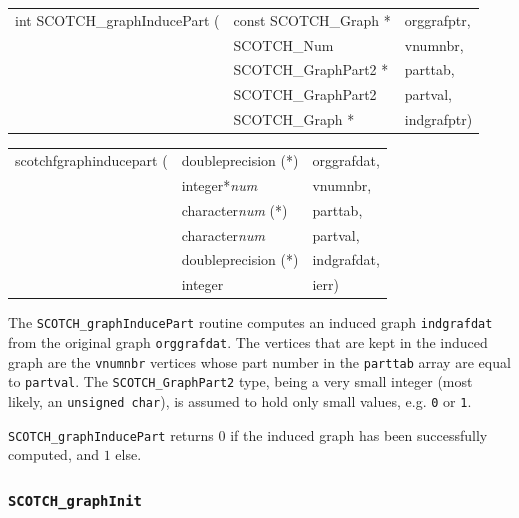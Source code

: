 \begin{itemize}
\progsyn

{\tt\begin{tabular}{l@{}ll}
int SCOTCH\_graphInducePart ( & const SCOTCH\_Graph * & orggrafptr, \\
                              & SCOTCH\_Num           & vnumnbr, \\
                              & SCOTCH\_GraphPart2 *  & parttab, \\
                              & SCOTCH\_GraphPart2    & partval, \\
                              & SCOTCH\_Graph *       & indgrafptr)
\end{tabular}}

{\tt\begin{tabular}{l@{}ll}
scotchfgraphinducepart ( & doubleprecision (*)    & orggrafdat, \\
                         & integer*{\it num}      & vnumnbr, \\
                         & character{\it num} (*) & parttab, \\
                         & character{\it num}     & partval, \\
                         & doubleprecision (*)    & indgrafdat, \\
                         & integer                & ierr)

\end{tabular}}

\progdes

The {\tt SCOTCH\_graphInducePart} routine computes an induced graph 
\texttt{indgrafdat} from the original graph \texttt{orggrafdat}. The
vertices that are kept in the induced graph are the \texttt{vnumnbr}
vertices whose part number in the \texttt{parttab} array are equal to
\texttt{partval}. The \texttt{SCOTCH\_\lbt Graph\lbt Part2} type,
being a very small integer (most likely, an \texttt{unsigned char}),
is assumed to hold only small values, e.g. \texttt{0} or \texttt{1}.

\progret

{\tt SCOTCH\_graphInducePart} returns $0$ if the induced graph has
been successfully computed, and $1$ else.
\end{itemize}

\subsubsection{{\tt SCOTCH\_graphInit}}
\label{sec-lib-func-graphinit}

